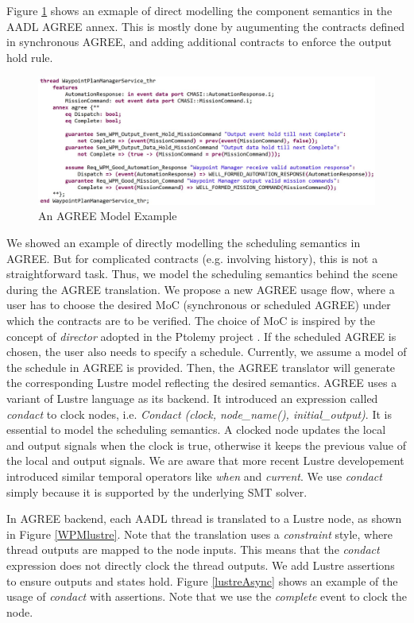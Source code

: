 Figure \ref{wpmAGREE} shows an exmaple of direct modelling the component semantics in the AADL AGREE annex. This is mostly done by augumenting the contracts defined in synchronous AGREE, and adding additional contracts to enforce the output hold rule.

\begin{figure}[ht!]
\centering
\includegraphics[width=130mm]{wpmAGREE.jpg}
\caption{An AGREE Model Example\label{wpmAGREE}}
\end{figure}

We showed an example of directly modelling the scheduling semantics in AGREE. But for complicated contracts (e.g. involving history), this is not a straightforward task. Thus, we model the scheduling semantics behind the scene during the AGREE translation. We propose a new AGREE usage flow, where a user has to choose the desired MoC (synchronous or scheduled AGREE) under which the contracts are to be verified. The choice of MoC is inspired by the concept of \emph{director} adopted in the Ptolemy project \cite{Ptolemy}. If the scheduled AGREE is chosen, the user also needs to specify a schedule. Currently, we assume a model of the schedule in AGREE is provided. Then, the AGREE translator will generate the corresponding Lustre model reflecting the desired semantics. AGREE uses a variant of Lustre \cite{GAO2008111} language as its backend. It introduced an expression called \emph{condact} to clock nodes, i.e. \emph{Condact (clock, node\_name(), initial\_output)}. It is essential to model the scheduling semantics. A clocked node updates the local and output signals when the clock is true, otherwise it keeps the previous value of the local and output signals. We are aware that more recent Lustre developement introduced similar temporal operators like \emph{when} and \emph{current}. We use \emph{condact} simply because it is supported by the underlying SMT solver.

In AGREE backend, each AADL thread is translated to a Lustre node, as shown in Figure \ref{WPMlustre}. Note that the translation uses a \emph{constraint} style, where thread outputs are mapped to the node inputs. This means that the \emph{condact} expression does not directly clock the thread outputs. We add Lustre assertions to ensure outputs and states hold. Figure \ref{lustreAsync} shows an example of the usage of \emph{condact} with assertions. Note that we use the \emph{complete} event to clock the node. 

